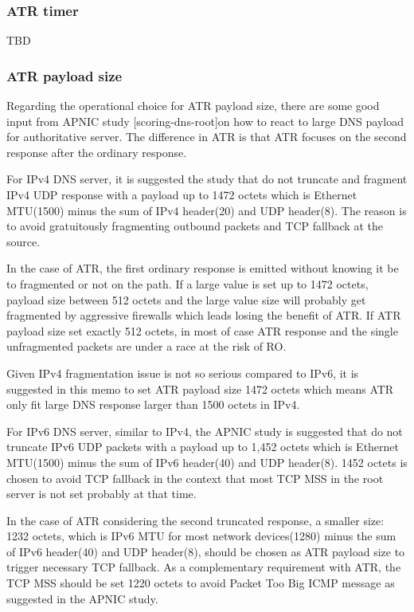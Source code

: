    \subsubsection{ATR timer}

   TBD

   \subsubsection{ATR payload size}

   Regarding the operational choice for ATR payload size, there are some
   good input from APNIC study [scoring-dns-root]on how to react to
   large DNS payload for authoritative server.  The difference in ATR is
   that ATR focuses on the second response after the ordinary response.

   For IPv4 DNS server, it is suggested the study that do not truncate
   and fragment IPv4 UDP response with a payload up to 1472 octets which
   is Ethernet MTU(1500) minus the sum of IPv4 header(20) and UDP
   header(8).  The reason is to avoid gratuitously fragmenting outbound
   packets and TCP fallback at the source.

   In the case of ATR, the first ordinary response is emitted without
   knowing it be to fragmented or not on the path.  If a large value is
   set up to 1472 octets, payload size between 512 octets and the large
   value size will probably get fragmented by aggressive firewalls which
   leads losing the benefit of ATR.  If ATR payload size set exactly 512
   octets, in most of case ATR response and the single unfragmented
   packets are under a race at the risk of RO.

   Given IPv4 fragmentation issue is not so serious compared to IPv6, it
   is suggested in this memo to set ATR payload size 1472 octets which
   means ATR only fit large DNS response larger than 1500 octets in
   IPv4.

   For IPv6 DNS server, similar to IPv4, the APNIC study is suggested
   that do not truncate IPv6 UDP packets with a payload up to 1,452
   octets which is Ethernet MTU(1500) minus the sum of IPv6 header(40)
   and UDP header(8). 1452 octets is chosen to avoid TCP fallback in the
   context that most TCP MSS in the root server is not set probably at
   that time.

   In the case of ATR considering the second truncated response, a
   smaller size: 1232 octets, which is IPv6 MTU for most network
   devices(1280) minus the sum of IPv6 header(40) and UDP header(8),
   should be chosen as ATR payload size to trigger necessary TCP
   fallback.  As a complementary requirement with ATR, the TCP MSS
   should be set 1220 octets to avoid Packet Too Big ICMP message as
   suggested in the APNIC study.

